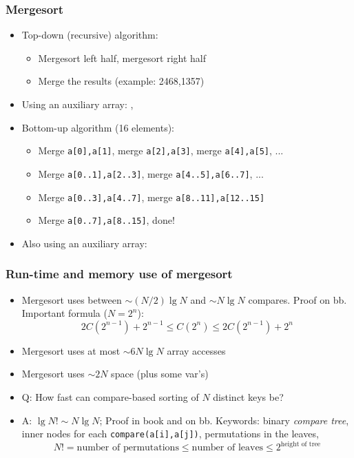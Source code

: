 \documentclass[handout]{beamer}
\newcommand{\git}{https://github.com/marcbezem/INF102/blob/master}
\begin{document}
\begin{frame}[fragile]
    \frametitle{Mergesort}

\begin{itemize}[<+->]
\item Top-down (recursive) algorithm:
  \begin{itemize}[<+->]
  \item Mergesort left half, mergesort right half
  \item Merge the results (example: 2468,1357)
  \end{itemize}     
\item Using an auxiliary array:
\href{\git/programs/sorting/mergeSort/TopDownMergeSort.java}%
{\color{red}{TopDownMergeSort.java}},~
\href{http://algs4.cs.princeton.edu/lectures/22DemoMerge.mov}{\color{red}{Movie}}
\item Bottom-up algorithm (16 elements):
  \begin{itemize}[<+->]
  \item Merge {\tt a[0],a[1]}, merge {\tt a[2],a[3]}, merge {\tt a[4],a[5]}, ...
  \item Merge {\tt a[0..1],a[2..3]}, merge {\tt a[4..5],a[6..7]},  ...
  \item Merge {\tt a[0..3],a[4..7]}, merge {\tt a[8..11],a[12..15]}
  \item Merge {\tt a[0..7],a[8..15]}, done!
  \end{itemize}     
\item Also using an auxiliary array:
\href{\git/programs/sorting/mergeSort/BottomUpMergeSort.java}%
{\color{red}{BottomUpMergeSort.java}}
\end{itemize}     
\end{frame}

\begin{frame}[fragile]
    \frametitle{Run-time and memory use of mergesort}

\begin{itemize}[<+->]
\item Mergesort uses between $\sim (N/2) \lg N$ and $\sim N \lg N$ compares.
Proof on bb. Important formula ($N=2^n$):
$$2C(2^{n-1}) + 2^{n-1} \leq C(2^{n}) \leq 2C(2^{n-1}) + 2^{n}$$
\item Mergesort uses at most $\sim 6N \lg N$ array accesses
\item Mergesort uses $\sim 2N$ space (plus some var's)
\item Q: How fast can compare-based sorting of $N$ distinct keys be?
\item A: $\lg N! \sim N\lg N$; Proof in book and on bb. Keywords: 
binary \emph{compare tree}, inner nodes for each {\tt compare(a[i],a[j])}, 
permutations in the leaves,
$$ N! = \text{number of permutations}  
     \leq \text{number of leaves} \leq 2^\text{height of tree} $$
\end{itemize}     
\end{frame}
\end{document}
